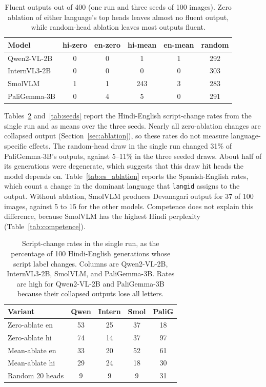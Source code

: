 \documentclass[10pt]{article}
\begin{document}
\begin{table}[H]
\centering
\caption{Fluent outputs out of 400 (one run and three seeds of 100 images). Zero ablation of either language's top heads leaves almost no fluent output, while random-head ablation leaves most outputs fluent.}
\label{tab:fluency}
\begin{tabular}{l ccccc}
\toprule
Model & hi-zero & en-zero & hi-mean & en-mean & random \\
\midrule
Qwen2-VL-2B  & 0 & 0 & 1 & 1 & 292 \\
InternVL3-2B & 0 & 0 & 0 & 0 & 303 \\
SmolVLM      & 1 & 1 & 243 & 3 & 283 \\
PaliGemma-3B & 0 & 4 & 5 & 0 & 291 \\
\bottomrule
\end{tabular}
\end{table}

Tables~\ref{tab:ablation} and~\ref{tab:seeds} report the Hindi-English script-change rates from the single run and as means over the three seeds. Nearly all zero-ablation changes are collapsed output (Section~\ref{sec:ablation}), so these rates do not measure language-specific effects. The random-head draw in the single run changed 31\% of PaliGemma-3B's outputs, against 5--11\% in the three seeded draws. About half of its generations were degenerate, which suggests that this draw hit heads the model depends on. Table~\ref{tab:es_ablation} reports the Spanish-English rates, which count a change in the dominant language that \texttt{langid} assigns to the output. Without ablation, SmolVLM produces Devanagari output for 37 of 100 images, against 5 to 15 for the other models. Competence does not explain this difference, because SmolVLM has the highest Hindi perplexity (Table~\ref{tab:competence}).

\begin{table}[H]
\centering
\caption{Script-change rates in the single run, as the percentage of 100 Hindi-English generations whose script label changes. Columns are Qwen2-VL-2B, InternVL3-2B, SmolVLM, and PaliGemma-3B. Rates are high for Qwen2-VL-2B and PaliGemma-3B because their collapsed outputs lose all letters.}
\label{tab:ablation}
\begin{tabular}{l cccc}
\toprule
Variant & Qwen & Intern & Smol & PaliG \\
\midrule
Zero-ablate en & 53 & 25 & 37 & 18 \\
Zero-ablate hi & 74 & 14 & 37 & 97 \\
Mean-ablate en & 33 & 20 & 52 & 61 \\
Mean-ablate hi & 29 & 24 & 18 & 30 \\
\midrule
Random 20 heads & 9 & 9 & 9 & 31 \\
\bottomrule
\end{tabular}
\end{table}
\end{document}
